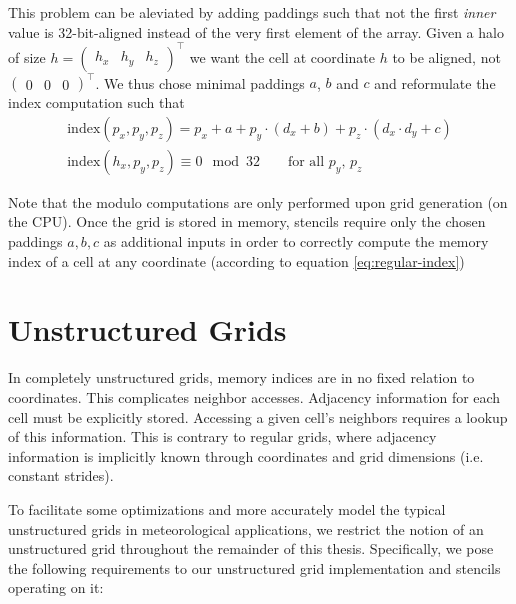 This problem can be aleviated by adding paddings such that not the first \emph{inner} value is 32-bit-aligned instead of the very first element of the array. Given a halo of size $h = \begin{pmatrix}h_x & h_y & h_z\end{pmatrix}^\top$ we want the cell at coordinate $h$ to be aligned, not $\begin{pmatrix} 0 & 0 & 0\end{pmatrix}^\top$. We thus chose minimal paddings $a$, $b$ and $c$ and reformulate the index computation such that
\begin{gather}
    \text{index}\left(p_x, p_y, p_z\right) = p_x + a + p_y \cdot \left(d_x + b\right) + p_z \cdot \left(d_x \cdot d_y + c\right) \label{eq:regular-index}
    \\
    \text{index}\left(h_x, p_y, p_z\right) \equiv 0 \mod 32 \qquad \text{for all $p_y$, $p_z$}
\end{gather}

Note that the modulo computations are only performed upon grid generation (on the CPU). Once the grid is stored in memory, stencils require only the chosen paddings $a, b, c$ as additional inputs in order to correctly compute the memory index of a cell at any coordinate (according to equation \ref{eq:regular-index})

\section{Unstructured Grids}

In completely unstructured grids, 
memory indices are in no fixed relation to coordinates. This complicates neighbor accesses. Adjacency information for each cell must be explicitly stored. Accessing a given cell's neighbors requires a lookup of this information. This is contrary to regular grids, where adjacency information is implicitly known through coordinates and grid dimensions (i.e. constant strides).

To facilitate some optimizations and more accurately model the typical unstructured grids in meteorological applications, we restrict the notion of an unstructured grid throughout the remainder of this thesis. Specifically, we pose the following requirements to our unstructured grid implementation and stencils operating on it:

